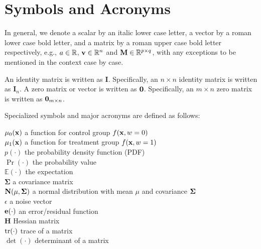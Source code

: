 \chapter*{Symbols and Acronyms}
\label{chap:sym}

In general, we denote a scalar by an italic lower case letter,
a vector by a roman lower case bold letter,
and a matrix by a roman upper case bold letter respectively, e.g., 
$a \in \mathbb{R} $, $\mathbf{v} \in \mathbb{R}^n$ and $\mathbf{M} \in \mathbb{R}^{p \times q}$, with any exceptions to be mentioned in the context case by case.

An identity matrix is written as $\mathbf{I}$. Specifically, an $n\times n$ identity matrix is written as $\mathbf{I}_n$.
A zero matrix or vector is written as ${\bf 0}$. Specifically, an $m\times n$ zero matrix is written as ${\bf 0}_{m\times n}$.

Specialized symbols and major acronyms are defined as follows:

\newpage

\noindent
$\mu_0(\mathbf{x})$                          \hfill  a function for control group $f(\mathbf{x}, w = 0)$ \\
$\mu_1(\mathbf{x})$                          \hfill  a function for treatment group $f(\mathbf{x}, w = 1)$ \\
$p(\cdot)$                     \hfill the probability density function (PDF) \\
$\Pr(\cdot)$                   \hfill the probability value \\
$\mathbb{E}(\cdot)$            \hfill  the expectation \\
$\bm\Sigma$                    \hfill a covariance matrix \\
$\mathbf{N}(\mu,\bm\Sigma)$             \hfill a normal distribution with mean $\mu$ and covariance $\bm\Sigma$ \\
$\epsilon$                     \hfill a noise vector \\
${\bf e}(\cdot)$               \hfill an error/residual function \\
$\mathbf{H}$                   \hfill Hessian matrix \\
$\mathrm{tr}(\cdot)$                   \hfill trace of a matrix \\
$\det(\cdot)$                  \hfill determinant of a matrix \\

